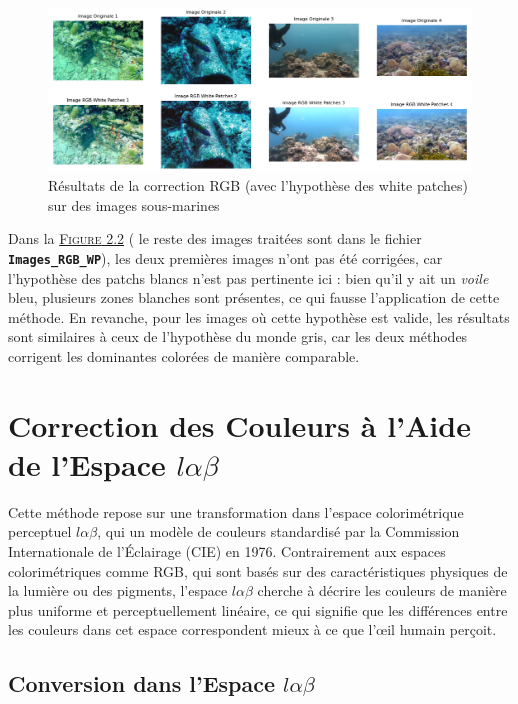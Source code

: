 \documentclass[10pt, a4paper]{extarticle}
\numberwithin{equation}{section}
\numberwithin{figure}{section}
\begin{document}
\begin{figure}[h!]
\begin{center}
\includegraphics[width=18cm]{image005.png}
\end{center}
\label{figure2.2}
\caption{Résultats de la correction RGB (avec l'hypothèse des white patches) sur des images sous-marines}
\end{figure} 

\par Dans la \hyperref[figure2.2]{\textsc{Figure} 2.2} ( le reste des images traitées sont dans le fichier \colorbox{gray!15}{\texttt{\textbf{Images\_RGB\_WP}}}), les deux premières images n'ont pas été corrigées, car l'hypothèse des patchs blancs n'est pas pertinente ici : bien qu'il y ait un \textit{voile} bleu, plusieurs zones blanches sont présentes, ce qui fausse l'application de cette méthode. En revanche, pour les images où cette hypothèse est valide, les résultats sont similaires à ceux de l'hypothèse du monde gris, car les deux méthodes corrigent les dominantes colorées de manière comparable.

\section{Correction des Couleurs à l'Aide de l'Espace $l\alpha\beta$}

\par Cette méthode repose sur une transformation dans l'espace colorimétrique perceptuel $l\alpha\beta$, qui un modèle de couleurs standardisé par la Commission Internationale de l'Éclairage (CIE) en 1976. Contrairement aux espaces colorimétriques comme RGB, qui sont basés sur des caractéristiques physiques de la lumière ou des pigments, l'espace $l\alpha\beta$ cherche à décrire les couleurs de manière plus uniforme et perceptuellement linéaire, ce qui signifie que les différences entre les couleurs dans cet espace correspondent mieux à ce que l'œil humain perçoit.

\subsection{Conversion dans l'Espace $l\alpha\beta$}
\end{document}
